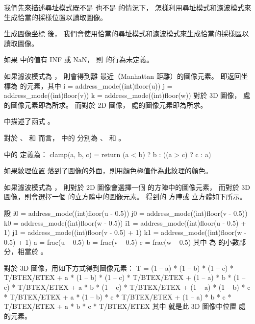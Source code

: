 我們先來描述尋址模式既不是 
也不是  的情況下，
怎樣利用尋址模式和濾波模式來生成恰當的採樣位置以讀取圖像。

生成圖像坐標  後，
我們會使用恰當的尋址模式和濾波模式來生成恰當的採樣區以讀取圖像。

如果  中的值有 INF 或 NaN，
則  的行為未定義。

{}

如果濾波模式為 ，
則會得到離  最近（Manhattan 距離）的圖像元素。
即返回坐標為  的元素，其中
\startclc[indentnext=no]
i = address_mode((int)floor(u))
j = address_mode((int)floor(v))
k = address_mode((int)floor(w))
\stopclc
對於 3D 圖像，  處的圖像元素即為所求。
而對於 2D 圖像，  處的圖像元素即為所求。

中描述了函式 。

{}

對於 、  和  而言，
中的  分別為 、  和 。

中的  定義為：
\startclc
clamp(a, b, c) = return (a < b) ? b : ((a > c) ? c : a)
\stopclc

如果紋理位置  落到了圖像的外面，則用顏色極值作為此紋理的顏色。

{}

如果濾波模式為 ，
則對於 2D 圖像會選擇一個  的方陣中的圖像元素，
而對於 3D 圖像，則會選擇一個  的立方體中的圖像元素。
得到的  方陣或  立方體如下所示。

設
\startclc[indentnext=no]
i0 = address_mode((int)floor(u - 0.5))
j0 = address_mode((int)floor(v - 0.5))
k0 = address_mode((int)floor(w - 0.5))
i1 = address_mode((int)floor(u - 0.5) + 1)
j1 = address_mode((int)floor(v - 0.5) + 1)
k1 = address_mode((int)floor(w - 0.5) + 1)
a  = frac(u – 0.5)
b  = frac(v – 0.5)
c  = frac(w – 0.5)
\stopclc
其中  為  的小數部分，相當於 。

對於 3D 圖像，用如下方式得到圖像元素：
\startclc[indentnext=no]
T = (1 – a) * (1 – b) * (1 – c) * T/BTEX/ETEX
    + a * (1 – b) * (1 – c) * T/BTEX/ETEX
    + (1 – a) * b * (1 – c) * T/BTEX/ETEX
    + a * b * (1 – c) * T/BTEX/ETEX
    + (1 – a) * (1 – b) * c * T/BTEX/ETEX
    + a * (1 – b) * c * T/BTEX/ETEX
    + (1 – a) * b * c * T/BTEX/ETEX
    + a * b * c * T/BTEX/ETEX
\stopclc
其中  就是此 3D 圖像中位置  處的元素。

